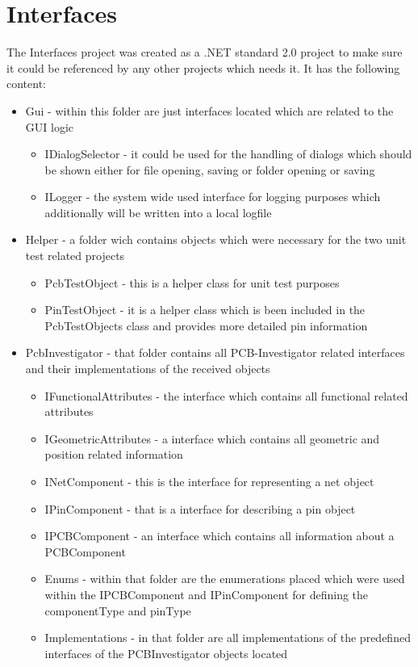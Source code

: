 	\section{Interfaces}
The Interfaces project was created as a .NET standard 2.0 project to make sure it could be referenced by any other projects which needs it. It has the following content:
\begin{itemize}
	\item Gui - within this folder are just interfaces located which are related to the \ac{GUI} logic
	\begin{itemize}
		\item IDialogSelector - it could be used for the handling of dialogs which should be shown either for file opening, saving or folder opening or saving
		\item ILogger - the system wide used interface for logging purposes which additionally will be written into a local logfile
	\end{itemize}
	\item Helper - a folder wich contains objects which were necessary for the two unit test related projects
	\begin{itemize}
		\item PcbTestObject - this is a helper class for unit test purposes
		\item PinTestObject - it is a helper class which is been included in the PcbTestObjects class and provides more detailed pin information
	\end{itemize}
	\item PcbInvestigator - that folder contains all \ac{PCB}-Investigator related interfaces and their implementations of the received objects
	\begin{itemize}
		\item IFunctionalAttributes - the interface which contains all functional related attributes
		\item IGeometricAttributes - a interface which contains all geometric and position related information
		\item INetComponent - this is the interface for representing a net object
		\item IPinComponent - that is a interface for describing a pin object
		\item IPCBComponent - an interface which contains all information about a PCBComponent
		\item Enums - within that folder are the enumerations placed which were used within the IPCBComponent and IPinComponent for defining the componentType and pinType
		\item Implementations - in that folder are all implementations of the predefined interfaces of the PCBInvestigator objects located
	\end{itemize}
\end{itemize}

